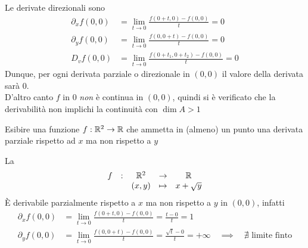 \begin{exercise}
	\begin{solution}
		Le derivate direzionali sono
		\begin{align*}
			\partial_x f(0,0) &= \lim\limits_{t \to 0} \frac{f(0+t,0)-f(0,0)}{t} = 0\\
			\partial_y f(0,0) &= \lim\limits_{t \to 0} \frac{f(0,0+t)-f(0,0)}{t} = 0\\
			D_v f(0,0) &= \lim\limits_{t \to 0} \frac{f(0+t_1,0+t_2)-f(0,0)}{t} = 0
		\end{align*}
		Dunque, per ogni derivata parziale o direzionale in $(0,0)$ il valore della derivata sarà $0$.\\
		D'altro canto $f$ in $0$ \textit{non} è continua in $(0,0)$, quindi si è verificato che la derivabilità non implichi la continuità con $\dim A > 1$
	\end{solution}
\end{exercise}
\begin{exercise}
	Esibire una funzione $f: \mathbb{R}^2 \to \mathbb{R}$ che ammetta in (almeno) un punto una derivata parziale rispetto ad $x$ ma non rispetto a $y$
	\begin{solution}
		La
		\[\begin{array}{ccccc} {f} & : & {\mathbb{R}^2} & \to & {\mathbb{R}} \\ & & {(x,y)} & \mapsto & {x+\sqrt{y}} \\ \end{array}\]
		È derivabile parzialmente rispetto a $x$ ma non rispetto a $y$ in $(0,0)$, infatti
		\begin{align*}
			\partial_x f(0,0) &= \lim\limits_{t \to 0} \frac{f(0+t,0)-f(0,0)}{t} = \frac{t-0}{t} = 1\\
			\partial_y f(0,0) &= \lim\limits_{t \to 0} \frac{f(0,0+t)-f(0,0)}{t} = \frac{\sqrt{t}-0}{t} = +\infty \quad \implies \quad \nexists \text{ limite finto}
		\end{align*}
	\end{solution}
\end{exercise}

\newpage
